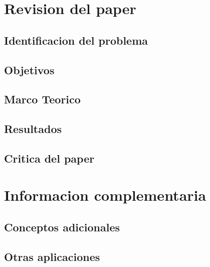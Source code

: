 \maketitle

\section{Revision del paper}

\subsection{Identificacion del problema}

\subsection{Objetivos}

\subsection{Marco Teorico} %

\subsection{Resultados} %

\subsection{Critica del paper} %

\section{Informacion complementaria} %
\subsection{Conceptos adicionales} %

\subsection{Otras aplicaciones} %

